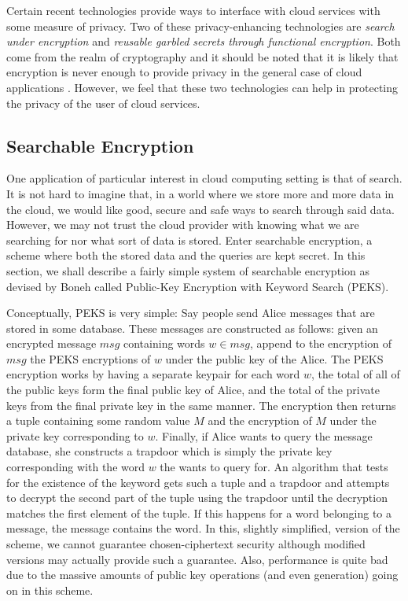\documentclass[12pt]{article}
\begin{document}
Certain recent technologies provide ways to interface with cloud services with some measure of privacy.
Two of these privacy-enhancing technologies are \emph{search under encryption} and \emph{reusable garbled secrets through functional encryption}.
Both come from the realm of cryptography and it should be noted that it is likely that encryption is never enough to provide privacy in the general case of cloud applications \cite{van2010impossibility}.
However, we feel that these two technologies can help in protecting the privacy of the user of cloud services.

\subsection{Searchable Encryption}

One application of particular interest in cloud computing setting is that of search.
It is not hard to imagine that, in a world where we store more and more data in the cloud, we would like good, secure and safe ways to search through said data.
However, we may not trust the cloud provider with knowing what we are searching for nor what sort of data is stored.
Enter searchable encryption, a scheme where both the stored data and the queries are kept secret.
In this section, we shall describe a fairly simple system of searchable encryption as devised by Boneh \cite{boneh2004public} called Public-Key Encryption with Keyword Search (PEKS).

Conceptually, PEKS is very simple:
Say people send Alice messages that are stored in some database.
These messages are constructed as follows:
given an encrypted message $msg$ containing words $w \in msg$, append to the encryption of $msg$ the PEKS encryptions of $w$ under the public key of the Alice.
The PEKS encryption works by having a separate keypair for each word $w$, the total of all of the public keys form the final public key of Alice, and the total of the private keys  from the final private key in the same manner. The encryption then returns a tuple containing some random value $M$ and the encryption of $M$ under the private key corresponding to $w$.
Finally, if Alice wants to query the message database, she constructs a trapdoor which is simply the private key corresponding with the word $w$ the wants to query for.
An algorithm that tests for the existence of the keyword gets such a tuple and a trapdoor and attempts to decrypt the second part of the tuple using the trapdoor until the decryption matches the first element of the tuple.
If this happens for a word belonging to a message, the message contains the word. 
In this, slightly simplified, version of the scheme, we cannot guarantee chosen-ciphertext security although modified versions may actually provide such a guarantee.
Also, performance is quite bad due to the massive amounts of public key operations (and even generation) going on in this scheme.
\end{document}
